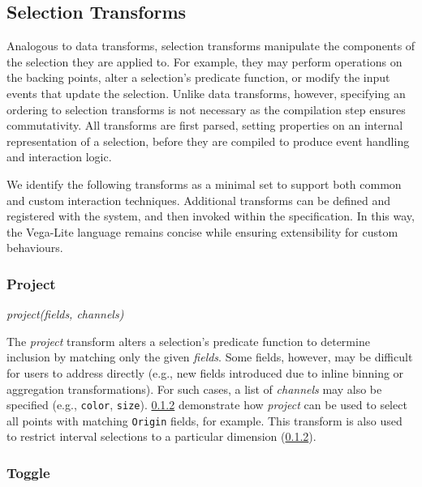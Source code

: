 \subsection{Selection Transforms}

Analogous to data transforms, selection transforms manipulate the components of
the selection they are applied to. For example, they may perform operations on
the backing points, alter a selection's predicate function, or modify the input
events that update the selection. Unlike data transforms, however, specifying an
ordering to selection transforms is not necessary as the compilation step
ensures commutativity. All transforms are first parsed, setting properties on an
internal representation of a selection, before they are compiled to produce
event handling and interaction logic.

We identify the following transforms as a minimal set to support both common and
custom interaction techniques. Additional transforms can be defined and
registered with the system, and then invoked within the specification. In this
way, the Vega-Lite language remains concise while ensuring extensibility for
custom behaviours.


\subsubsection{Project}

\centerline{\emph{project(fields, channels)}}

The \emph{project} transform alters a selection's predicate function to
determine inclusion by matching only the given \emph{fields}. Some fields,
however, may be difficult for users to address directly (e.g., new fields
introduced due to inline binning or aggregation transformations). For such
cases, a list of \emph{channels} may also be specified (e.g., \texttt{color},
\texttt{size}). \cref{} demonstrate how \emph{project} can
be used to select all points with matching \texttt{Origin} fields, for example.
This transform is also used to restrict interval selections to a particular
dimension (\cref{}).

\subsubsection{Toggle}

